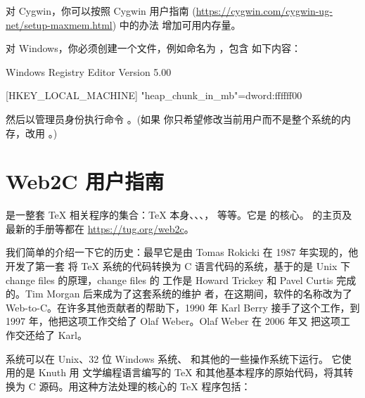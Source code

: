 \documentclass{article}
\begin{document}
对 Cygwin，你可以按照 Cygwin 用户指南
(\url{https://cygwin.com/cygwin-ug-net/setup-maxmem.html}) 中的办法
增加可用内存量。

对 Windows，你必须创建一个文件，例如命名为 ，包含
如下内容：

\begin{sverbatim}
Windows Registry Editor Version 5.00

[HKEY_LOCAL_MACHINE\Software\Cygwin]
"heap_chunk_in_mb"=dword:ffffff00
\end{sverbatim}

\noindent 然后以管理员身份执行命令 。(如果
你只希望修改当前用户而不是整个系统的内存，改用 。)

\section{Web2C 用户指南}

\Webc{} 是一整套 \TeX{} 相关程序的集合：\TeX{} 本身、\MF{}、\MP{}、\BibTeX{}，
等等。它是 \TL{} 的核心。\Webc{} 的主页及最新的手册等都在
\url{https://tug.org/web2c}。

我们简单的介绍一下它的历史：最早它是由 Tomas Rokicki 在 1987 年实现的，他开发了第一套
将 \TeX{} 系统的代码转换为 C 语言代码的系统，基于的是 Unix 下 change files
的原理，change files 的
工作是 Howard Trickey 和 Pavel Curtis 完成的。Tim Morgan 后来成为了这套系统的维护
者，在这期间，软件的名称改为了 Web-to-C\@。在许多其他贡献者的帮助下，1990 年 Karl Berry
接手了这个工作，到 1997 年，他把这项工作交给了 Olaf Weber。Olaf Weber 在 2006 年又
把这项工作交还给了 Karl。

\Webc{} 系统可以在 Unix、32 位 Windows 系统、\MacOSX{} 和其他的一些操作系统下运行。
它使用的是 Knuth 用 \web{} 文学编程语言编写的 \TeX{} 和其他基本程序的原始代码，将其转换为 C
源码。用这种方法处理的核心的 \TeX{} 程序包括：
\end{document}
